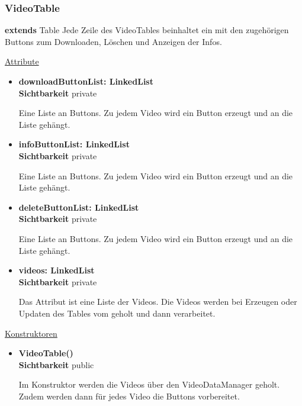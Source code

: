 \subsubsection{VideoTable}\label{VideoTable}
\textbf{extends}  Table \newline
Jede Zeile des VideoTables beinhaltet ein  mit den zugehörigen Buttons zum Downloaden, Löschen und Anzeigen der Infos. \newline

\underline{Attribute}
\begin{itemize}
\itemsep0pt

\item \textbf{downloadButtonList: LinkedList} \hfill\\ 
\textbf{Sichtbarkeit} private

Eine Liste an Buttons. Zu jedem Video wird ein Button erzeugt und an die Liste gehängt.

\item \textbf{infoButtonList: LinkedList} \hfill\\ 
\textbf{Sichtbarkeit} private

Eine Liste an Buttons. Zu jedem Video wird ein Button erzeugt und an die Liste gehängt.

\item \textbf{deleteButtonList: LinkedList} \hfill\\ 
\textbf{Sichtbarkeit} private

Eine Liste an Buttons. Zu jedem Video wird ein Button erzeugt und an die Liste gehängt.

\item \textbf{videos: LinkedList} \hfill\\
\textbf{Sichtbarkeit} private
 
Das Attribut ist eine Liste der Videos. Die Videos werden bei Erzeugen oder Updaten des Tables vom  geholt und dann verarbeitet.
\end{itemize}

\underline{Konstruktoren}
\begin{itemize}
\itemsep0pt

\item \textbf{VideoTable()} \hfill\\ 
\textbf{Sichtbarkeit} public

Im Konstruktor werden die Videos über den VideoDataManager geholt. Zudem werden dann für jedes Video die Buttons vorbereitet.

\end{itemize}


